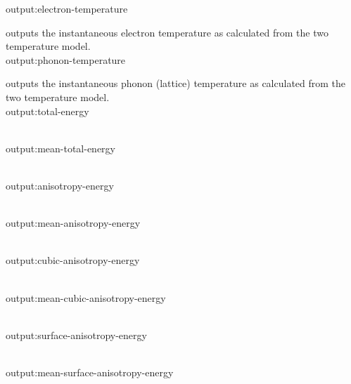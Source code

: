 {\zicf output:electron-temperature} outputs the instantaneous electron temperature as calculated from the two temperature model.\\

{\zicf output:phonon-temperature} outputs the instantaneous phonon (lattice) temperature as calculated from the two temperature model.\\




{\zicf output:total-energy}\\

{\zicf output:mean-total-energy}\\

{\zicf output:anisotropy-energy}\\

{\zicf output:mean-anisotropy-energy}\\

{\zicf output:cubic-anisotropy-energy}\\

{\zicf output:mean-cubic-anisotropy-energy}\\

{\zicf output:surface-anisotropy-energy}\\

{\zicf output:mean-surface-anisotropy-energy}\\

